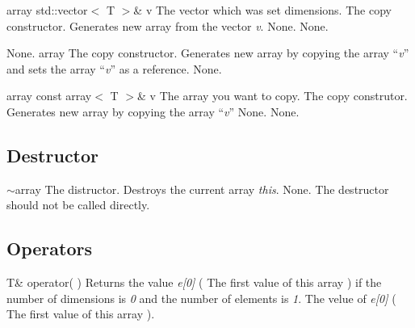 \setNormalInstance
\printMethodWithOneParam
{}
{array}
{std::vector$<$ T $>$\&}
{v}
{The vector which was set dimensions.}
{The copy constructor. Generates new array from the vector {\em v}.}
{None.}
{None.}

\setNormalInstance
\setCorrectWidthThree{8pt}
\printMethodWithParamsSaved
{}
{None.}
{array}
{The copy constructor. Generates new array by copying the array ``{\em v}'' and
sets the array ``{\em v}'' as a reference.}
{None.}
\setCorrectWidthThree{4pt}

\setNormalInstance
\printMethodWithOneParam
{}
{array}
{const array$<$ T $>$\&}
{v}
{The array you want to copy.}
{The copy construtor. Generates new array by copying the array ``{\em v}'' }
{None.}
{None.}

\vspace*{10mm}

\subsection{Destructor}

\setNormalInstance
\printEmptyMethodReturnSpecial
{}
{$\sim$array}
{The distructor. Destroys the current array {\em this}.}
{None.}
{The destructor should not be called directly.}

\clearpage

\subsection{Operators}

\setNormalInstance
\printEmptyMethodReturn
{T\&}
{operator( )}
{Returns the value {\em e[0]} ( The first value of this array ) if the
number of dimensions is {\em 0} and the number of elements is {\em 1}.}
{The velue of {\em e[0]} ( The first value of this array ).}

